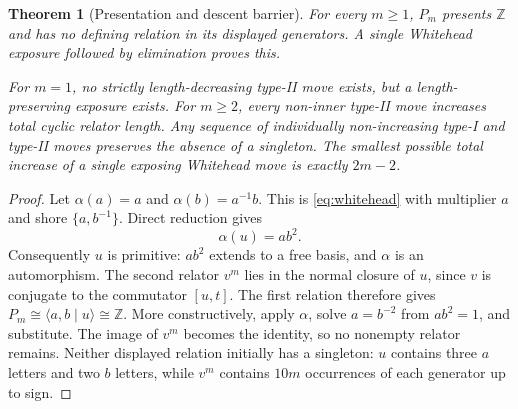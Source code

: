 \documentclass[11pt,letterpaper]{article}
\newtheorem{theorem}{Theorem}[section]
\theoremstyle{definition}\newtheorem{definition}[theorem]{Definition}
\newcommand{\Z}{\mathbb Z}
\newcommand{\set}[1]{\{#1\}}
\begin{document}
\begin{theorem}[Presentation and descent barrier]\label{thm:barrier}
For every $m\ge1$, $P_m$ presents $\Z$ and has no defining relation in its displayed generators. A single Whitehead exposure followed by elimination proves this.

For $m=1$, no strictly length-decreasing type-II move exists, but a length-preserving exposure exists. For $m\ge2$, every non-inner type-II move increases total cyclic relator length. Any sequence of individually non-increasing type-I and type-II moves preserves the absence of a singleton. The smallest possible total increase of a \emph{single exposing} Whitehead move is exactly $2m-2$.
\end{theorem}
\begin{proof}
Let $\alpha(a)=a$ and $\alpha(b)=a^{-1}b$. This is \eqref{eq:whitehead} with multiplier $a$ and shore $\set{a,b^{-1}}$. Direct reduction gives
\[
 \alpha(u)=ab^2.
\]
Consequently $u$ is primitive: $ab^2$ extends to a free basis, and $\alpha$ is an automorphism. The second relator $v^m$ lies in the normal closure of $u$, since $v$ is conjugate to the commutator $[u,t]$. The first relation therefore gives $P_m\cong\langle a,b\mid u\rangle\cong\Z$. More constructively, apply $\alpha$, solve $a=b^{-2}$ from $ab^2=1$, and substitute. The image of $v^m$ becomes the identity, so no nonempty relator remains. Neither displayed relation initially has a singleton: $u$ contains three $a$ letters and two $b$ letters, while $v^m$ contains $10m$ occurrences of each generator up to sign.


\end{proof}
\end{document}

